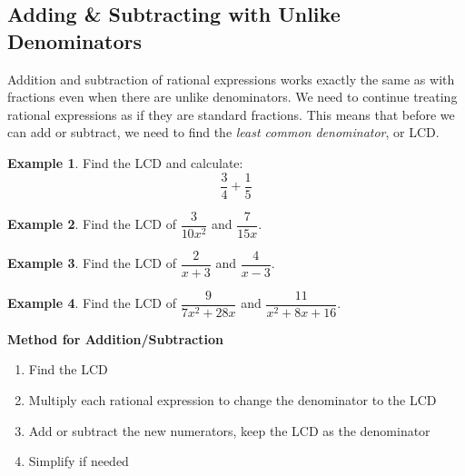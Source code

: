 \documentclass[addpoints,12pt]{exam}
\theoremstyle{definition}
\newtheorem{example}{Example}[subsection]
\begin{document}
\setcounter{section}{7}
\setcounter{subsection}{3}

\subsection{Adding \& Subtracting with Unlike Denominators}

\noindent Addition and subtraction of rational expressions works exactly the same as with fractions even when there are unlike denominators.
\vspace{.25in}
\noindent We need to continue treating rational expressions as if they are standard fractions. This means that before we can add or subtract, we need to find the \emph{least common denominator}, or LCD.

\vspace{.25in}
\begin{example}
Find the LCD and calculate: \[\dfrac{3}{4} + \dfrac{1}{5}\]
\vspace{1.25in}
\end{example}

\begin{example}
Find the LCD of $\dfrac{3}{10x^2}$ and $\dfrac{7}{15x}$.
\vspace{2in}
\end{example}

\begin{example}
Find the LCD of $\dfrac{2}{x+3}$ and $\dfrac{4}{x-3}$.
\end{example}

\newpage

\begin{example}
Find the LCD of $\dfrac{9}{7x^2+28x}$ and $\dfrac{11}{x^2+8x+16}$.
\vspace{2in}
\end{example}

\begin{mdframed}
\textbf{Method for Addition/Subtraction}
\begin{enumerate}
\item Find the LCD
\item Multiply each rational expression to change the denominator to the LCD
\item Add or subtract the new numerators, keep the LCD as the denominator
\item Simplify if needed
\end{enumerate}
\end{mdframed}

\vspace{.25in}
\end{document}
